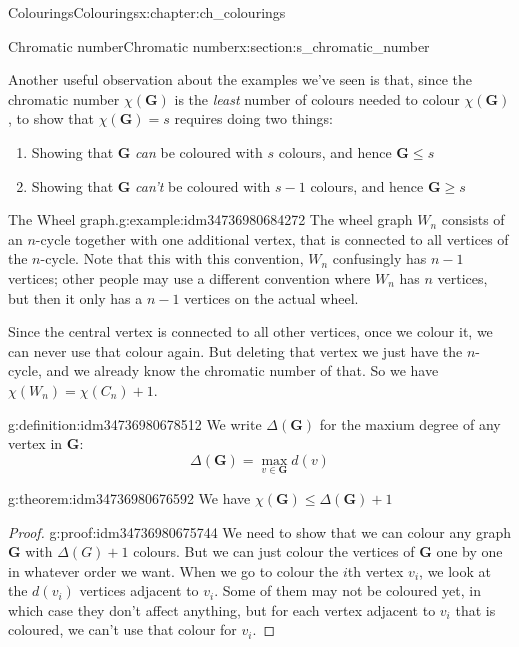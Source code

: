 \documentclass[oneside,10pt,]{book}
\numberwithin{equation}{section}
\newcommand{\bfG}{\mathbf{G}}
\begin{document}
\begin{chapterptx}{Colourings}{}{Colourings}{}{}{x:chapter:ch_colourings}
\begin{sectionptx}{Chromatic number}{}{Chromatic number}{}{}{x:section:s_chromatic_number}
\par
Another useful observation about the examples we've seen is that, since the chromatic number \(\chi(\bfG)\) is the \emph{least} number of colours needed to colour \(\chi(\bfG)\), to show that \(\chi(\bfG)=s\) requires doing two things:%
\begin{enumerate}
\item{}Showing that \(\bfG\) \emph{can} be coloured with \(s\) colours, and hence \(\bfG\leq s\)%
\item{}Showing that \(\bfG\) \emph{can't} be coloured with \(s-1\) colours, and hence \(\bfG\geq s\)%
\end{enumerate}
%
\begin{example}{The Wheel graph.}{g:example:idm34736980684272}%
The wheel graph \(W_n\) consists of an \(n\)-cycle together with one additional vertex, that is connected to all vertices of the \(n\)-cycle.  Note that this with this convention, \(W_n\) confusingly has \(n-1\) vertices; other people may use a different convention where \(W_n\) has \(n\) vertices, but then it only has a \(n-1\) vertices on the actual wheel.%
\par
Since the central vertex is connected to all other vertices, once we colour it, we can never use that colour again.  But deleting that vertex we just have the \(n\)-cycle, and we already know the chromatic number of that.  So we have \(\chi(W_n)=\chi(C_n)+1\).%
\end{example}
\begin{definition}{}{g:definition:idm34736980678512}%
We write \(\Delta(\bfG)\) for the maxium degree of any vertex in \(\bfG\):%
\begin{equation*}
\Delta(\bfG)=\max_{v\in \bfG} d(v)
\end{equation*}
%
\end{definition}
\begin{theorem}{}{}{g:theorem:idm34736980676592}%
We have \(\chi(\bfG)\leq \Delta(\bfG)+1\)%
\end{theorem}
\begin{proof}{}{g:proof:idm34736980675744}
We need to show that we can colour any graph \(\bfG\) with \(\Delta(G)+1\) colours.  But we can just colour the vertices of \(\bfG\) one by one in whatever order we want.  When we go to colour the \(i\)th vertex \(v_i\), we look at the \(d(v_i)\) vertices adjacent to \(v_i\).  Some of them may not be coloured yet, in which case they don't affect anything, but for each vertex adjacent to \(v_i\) that is coloured, we can't use that colour for \(v_i\).%

\end{proof}
\end{sectionptx}
\end{chapterptx}
\end{document}
